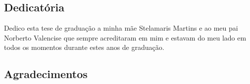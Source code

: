 




\clearpage
\begin{center}
\chapter*{Dedicatória}
\end{center}
\vspace*{1cm}

Dedico esta tese de graduação a minha mãe Stelamaris Martins e ao meu pai Norberto Valencise que sempre acreditaram em mim e estavam do meu lado em todos os momentos durante estes anos de graduação.

\clearpage
\clearpage
\begin{center}
\chapter*{Agradecimentos}
\end{center}

